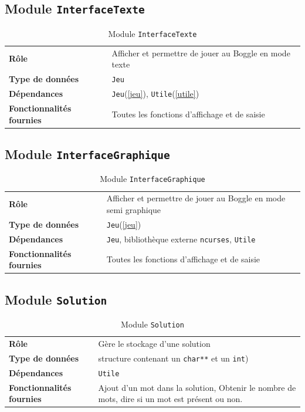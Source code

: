 \documentclass[12pt,a4paper,openany]{article}
\begin{document}
		\subsection{Module \texttt{InterfaceTexte}}
		\begin{table}[H]
			\centering
		\begin{tabular}{p{5cm} p{12cm}}
			\textbf{Rôle} & Afficher et permettre de jouer au Boggle en mode texte\\ 
			\textbf{Type de données} & \texttt{Jeu}\\ 
			\textbf{Dépendances} & \texttt{Jeu}(\ref{jeu}), \texttt{Utile}(\ref{utile})\\ 
			\textbf{Fonctionnalités fournies} & Toutes les fonctions d'affichage et de saisie
		\end{tabular}
		\caption{Module \texttt{InterfaceTexte}}
	\end{table}
		\subsection{Module \texttt{InterfaceGraphique}}
		\begin{table}[H]
			\centering
		\begin{tabular}{p{5cm} p{12cm}}
			\textbf{Rôle} & Afficher et permettre de jouer au Boggle en mode semi graphique\\ 
			\textbf{Type de données} & \texttt{Jeu}(\ref{jeu})\\ 
			\textbf{Dépendances} & \texttt{Jeu}, bibliothèque externe \texttt{ncurses}, \texttt{Utile}\\ 
			\textbf{Fonctionnalités fournies} & Toutes les fonctions d'affichage et de saisie
		\end{tabular}
		\caption{Module \texttt{InterfaceGraphique}}
	\end{table}
		\subsection{Module \texttt{Solution}}
		\label{solution}
		\begin{table}[H]
			\centering
		\begin{tabular}{p{5cm} p{12cm}}
			\textbf{Rôle} & Gère le stockage d'une solution\\ 
			\textbf{Type de données} & structure contenant un \texttt{char**} et un \texttt{int})\\ 
			\textbf{Dépendances} & \texttt{Utile}\\
			\textbf{Fonctionnalités fournies} & Ajout d'un mot dans la solution, Obtenir le nombre de mots, dire si un mot est
			présent ou non.\\ 
		\end{tabular}
		\caption{Module \texttt{Solution}}
	\end{table}
\end{document}
